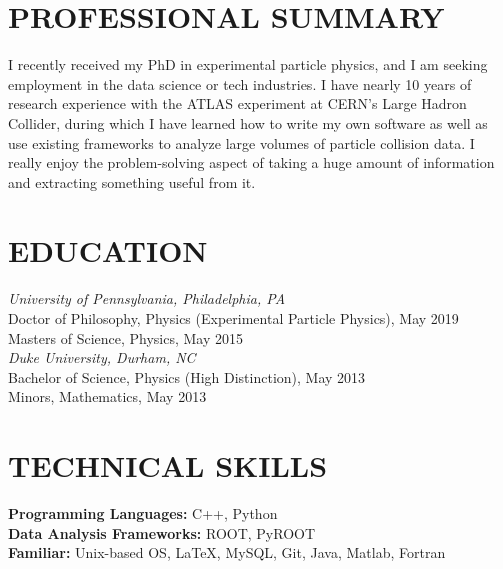 \documentclass{res}
\begin{document}
\begin{resume}

 

\section{PROFESSIONAL SUMMARY}
    I recently received my PhD in experimental particle physics, and I am seeking employment in the data science or tech industries.
    I have nearly 10 years of research experience with the ATLAS experiment at CERN's Large Hadron Collider, during which I have learned how to write my own software as well as use existing frameworks to analyze large volumes of particle collision data.
    I really enjoy the problem-solving aspect of taking a huge amount of information and extracting something useful from it.

\section{EDUCATION}          
    {\it University of Pennsylvania, Philadelphia, PA} \\
    Doctor of Philosophy, Physics (Experimental Particle Physics), May 2019 \\
    Masters of Science, Physics, May 2015 \\
    \newline
    {\it Duke University, Durham, NC} \\        
    Bachelor of Science, Physics (High Distinction), May 2013   \\       
    Minors, Mathematics, May 2013 

\section{TECHNICAL SKILLS}
    {\bf Programming Languages:} C++, Python\\
    {\bf Data Analysis Frameworks:} ROOT, PyROOT\\
    {\bf Familiar:} Unix-based OS, \LaTeX, MySQL, Git, Java, Matlab, Fortran


\end{resume}
\end{document}
